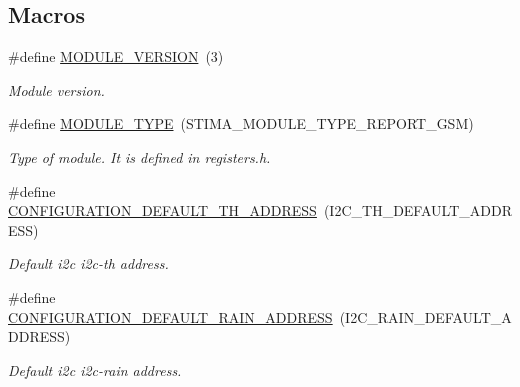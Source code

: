 \subsection*{Macros}
\begin{DoxyCompactItemize}
\item 
\mbox{\label{rmap-config_8h_aa8639a8d4e83d9cc4187d7a751228464}} 
\#define \hyperlink{rmap-config_8h_aa8639a8d4e83d9cc4187d7a751228464}{M\+O\+D\+U\+L\+E\+\_\+\+V\+E\+R\+S\+I\+ON}~(3)
\begin{DoxyCompactList}\small\item\em Module version. \end{DoxyCompactList}\item 
\mbox{\label{rmap-config_8h_a8c815d03b3fd3e18ca06f920a1eb4e8e}} 
\#define \hyperlink{rmap-config_8h_a8c815d03b3fd3e18ca06f920a1eb4e8e}{M\+O\+D\+U\+L\+E\+\_\+\+T\+Y\+PE}~(S\+T\+I\+M\+A\+\_\+\+M\+O\+D\+U\+L\+E\+\_\+\+T\+Y\+P\+E\+\_\+\+R\+E\+P\+O\+R\+T\+\_\+\+G\+SM)
\begin{DoxyCompactList}\small\item\em Type of module. It is defined in registers.\+h. \end{DoxyCompactList}\item 
\mbox{\label{rmap-config_8h_a413cd84e34db40559ab834cc89408cdb}} 
\#define \hyperlink{rmap-config_8h_a413cd84e34db40559ab834cc89408cdb}{C\+O\+N\+F\+I\+G\+U\+R\+A\+T\+I\+O\+N\+\_\+\+D\+E\+F\+A\+U\+L\+T\+\_\+\+T\+H\+\_\+\+A\+D\+D\+R\+E\+SS}~(I2\+C\+\_\+\+T\+H\+\_\+\+D\+E\+F\+A\+U\+L\+T\+\_\+\+A\+D\+D\+R\+E\+SS)
\begin{DoxyCompactList}\small\item\em Default i2c i2c-\/th address. \end{DoxyCompactList}\item 
\mbox{\label{rmap-config_8h_a682b556c001cdf90f49b3a4d19081fb3}} 
\#define \hyperlink{rmap-config_8h_a682b556c001cdf90f49b3a4d19081fb3}{C\+O\+N\+F\+I\+G\+U\+R\+A\+T\+I\+O\+N\+\_\+\+D\+E\+F\+A\+U\+L\+T\+\_\+\+R\+A\+I\+N\+\_\+\+A\+D\+D\+R\+E\+SS}~(I2\+C\+\_\+\+R\+A\+I\+N\+\_\+\+D\+E\+F\+A\+U\+L\+T\+\_\+\+A\+D\+D\+R\+E\+SS)
\begin{DoxyCompactList}\small\item\em Default i2c i2c-\/rain address. \end{DoxyCompactList}\item 

\end{DoxyCompactItemize}
